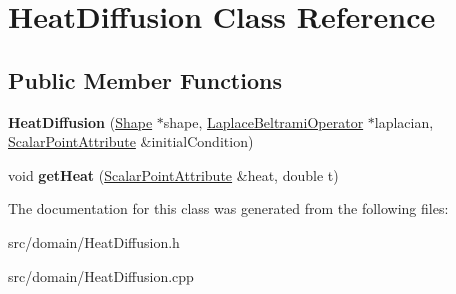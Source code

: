 \hypertarget{class_heat_diffusion}{}\section{Heat\+Diffusion Class Reference}
\label{class_heat_diffusion}
\subsection*{Public Member Functions}
\begin{DoxyCompactItemize}
\item 
\hypertarget{class_heat_diffusion_a467528cd87b044f5cfbf9d92702d9021}{}{\bfseries Heat\+Diffusion} (\hyperlink{class_shape}{Shape} $\ast$shape, \hyperlink{class_laplace_beltrami_operator}{Laplace\+Beltrami\+Operator} $\ast$laplacian, \hyperlink{class_scalar_point_attribute}{Scalar\+Point\+Attribute} \&initial\+Condition)\label{class_heat_diffusion_a467528cd87b044f5cfbf9d92702d9021}

\item 
\hypertarget{class_heat_diffusion_a8f465a0e8bf817f2d8ef12a4b1fb26d7}{}void {\bfseries get\+Heat} (\hyperlink{class_scalar_point_attribute}{Scalar\+Point\+Attribute} \&heat, double t)\label{class_heat_diffusion_a8f465a0e8bf817f2d8ef12a4b1fb26d7}

\end{DoxyCompactItemize}


The documentation for this class was generated from the following files\+:\begin{DoxyCompactItemize}
\item 
src/domain/Heat\+Diffusion.\+h\item 
src/domain/Heat\+Diffusion.\+cpp\end{DoxyCompactItemize}
